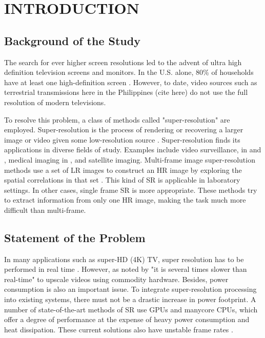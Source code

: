 
\chapter{INTRODUCTION} %

\label{Chapter1} %



\section{Background of the Study}

The search for ever higher screen resolutions led to the advent of ultra high definition television screens and monitors. 
In the U.S. alone, 80\% of households have at least one high-definition screen \citep{LRG2015}.
 However, to date, video sources such as terrestrial transmissions here in the Philippines (cite here) do not use the full resolution of modern televisions. %

To resolve this problem, a class of methods called "super-resolution" are employed.
Super-resolution is the process of rendering or recovering a larger image or video given some low-resolution source \citep{Dong2014}.
Super-resolution finds its applications in diverse fields of study. Examples include video surveillance, in \cite{Caner2003} and \cite{Zhang2010},  medical imaging in \cite{Malczewski2008}, and satellite imaging.
Multi-frame image super-resolution methods use a set of LR images to construct an HR image by exploring the spatial correlations in that set \citep{Cheng2013}.
This kind of SR is applicable in laboratory settings.
In other cases, single frame SR is more appropriate. 
These methods try to extract information from only one HR image, making the task much more difficult than multi-frame.



\section{Statement of the Problem}

In many applications such as super-HD (4K) TV, super resolution has to be performed in real time \citep{Shen2014}. However, as noted by \cite{Ishizaka2013} "it is several times slower than real-time" to upscale videos using commodity hardware.
Besides, power consumption is also an important issue. 
To integrate super-resolution processing into existing systems, there must not be a drastic increase in power footprint. 
A number of state-of-the-art methods of SR use GPUs and manycore CPUs, which offer a degree of performance at the expense of heavy power consumption and heat dissipation. 
These current solutions also have unstable frame rates \citep{Wu2011}. 

